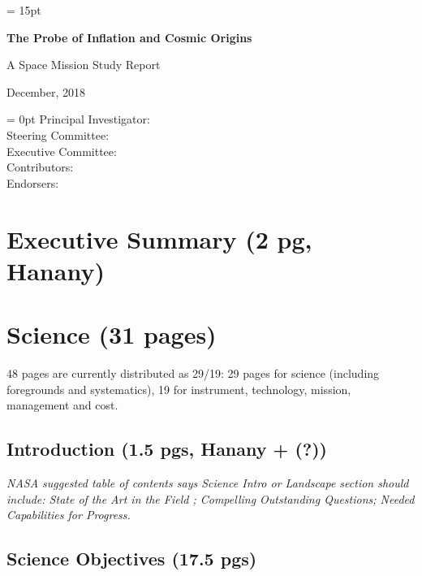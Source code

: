 \documentclass[12pt]{article}
\begin{document}


\setlength{\baselineskip}{0.96\baselineskip} %
\setlength{\parskip}{1.\parskip}

\parindent = 15pt


\setcounter{page}{0}
\setcounter{figure}{0}

\LARGE{ \centerline{\bf{The Probe of Inflation and Cosmic Origins}}}
\vspace{0.5in}
\Large{ \centerline{A Space Mission Study Report}}
\Large{ \centerline{December, 2018 }}
\vspace{0.5in}
\parindent = 0pt
\large{Principal Investigator:} \\
\large{Steering Committee:} \\
\large{Executive Committee:} \\
\large{Contributors:} \\
\large{Endorsers:} \\

\normalsize

\newpage

%


\section{Executive Summary (2 pg, Hanany)} 


\section{Science (31 pages)}

48 pages are currently distributed as 29/19: 29 pages for science (including foregrounds and systematics), 19 for instrument, technology, mission, management and cost.

    \subsection{Introduction (1.5 pgs, Hanany + (?))}

{\it NASA suggested table of contents says Science Intro or Landscape section should include: State of the Art in the Field ; 
Compelling Outstanding Questions; Needed Capabilities for Progress. }



\subsection{Science Objectives (17.5 pgs) } 
\end{document}
